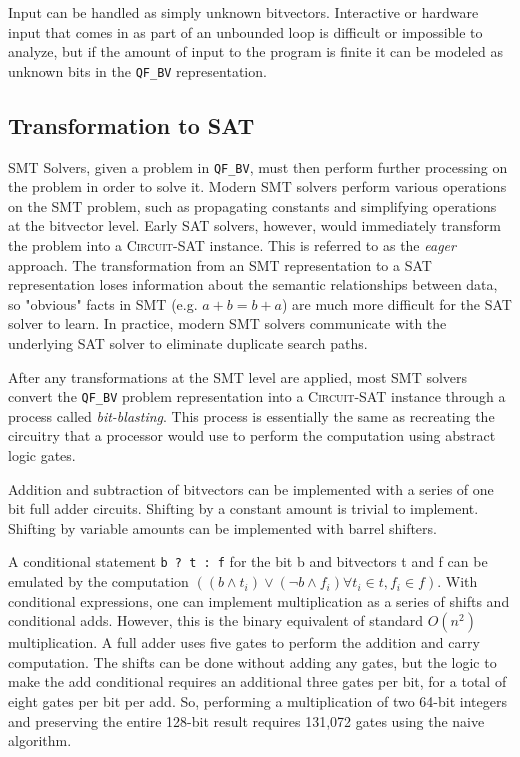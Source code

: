 \documentclass{sig-alternate}
\begin{document}
Input can be handled as simply unknown bitvectors.  Interactive or
hardware input that comes in as part of an unbounded loop is difficult
or impossible to analyze, but if the amount of input to the program
is finite it can be modeled as unknown bits in the \texttt{QF\_BV}
representation.

\subsection{Transformation to SAT}

SMT Solvers, given a problem in \texttt{QF\_BV}, must then perform
further processing on the problem in order to solve it.  Modern SMT
solvers perform various operations on the SMT problem, such as
propagating constants and simplifying operations at the bitvector
level.  Early SAT solvers, however, would immediately transform the
problem into a \textsc{Circuit-SAT} instance.  This is referred to
as the \textit{eager} approach.  The transformation from an SMT
representation to a SAT representation loses information about the
semantic relationships between data, so "obvious" facts in SMT
(e.g. $a + b = b + a$) are much more difficult for the SAT solver
to learn.  In practice, modern SMT solvers communicate with the
underlying SAT solver to eliminate duplicate search paths.

After any transformations at the SMT level are applied, most SMT
solvers convert the \texttt{QF\_BV} problem representation into a
\textsc{Circuit-SAT} instance through a process called
\textit{bit-blasting}.  This process is essentially the same as
recreating the circuitry that a processor would use to perform
the computation using abstract logic gates.

Addition and subtraction of bitvectors can be implemented with a
series of one bit full adder circuits.  Shifting by a constant
amount is trivial to implement.  Shifting by variable amounts can
be implemented with barrel shifters.

A conditional statement \verb|b ? t : f| for the bit b and bitvectors
t and f can be emulated by the computation 
$((b \wedge t_i) \vee (\neg b \wedge f_i) \forall t_i \in t, f_i \in f)$.
With conditional expressions, one can implement multiplication as a
series of shifts and conditional adds.  However, this is the binary
equivalent of standard $O(n^2)$ multiplication.  A full adder uses five
gates to perform the addition and carry computation.  The shifts can be
done without adding any gates, but the logic to make the add conditional
requires an additional three gates per bit, for a total of eight gates
per bit per add.  So, performing a multiplication of two 64-bit integers
and preserving the entire 128-bit result requires 131,072 gates using
the naive algorithm.
\end{document}
